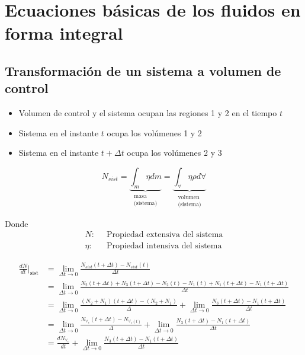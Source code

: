 \section{Ecuaciones básicas de los fluidos en forma integral}

\subsection{Transformación de un sistema a volumen de control}


\begin{itemize}
    \item Volumen de control y el sistema ocupan las regiones 1 y 2 en el tiempo \( t \)
    \item Sistema en el instante \( t \) ocupa los volúmenes 1 y 2
    \item Sistema en el instante \( t + \Delta t \) ocupa los volúmenes 2 y 3
\end{itemize}

\[
    N_{sist} = \underbrace{ \int_{m} \eta dm }_{
        \begin{array}{cc}
            \text{masa} \\
            \text{(sistema)}
        \end{array} } 
    = \underbrace{ \int_{\forall} \eta \rho d \forall }_{
        \begin{array}{cc}
            \text{volumen} \\
            \text{(sistema)}
        \end{array} }
\]

Donde
\[
    \begin{split}
        N: \; & \; \text{Propiedad extensiva del sistema} \\ 
        \eta: & \; \text{Propiedad intensiva del sistema}
    \end{split}
\]

\[
    \begin{split}
        \frac{ dN }{ dt } \Big|_{ \text{sist} } & = \lim_{ \Delta t \to 0 } \frac{ N_{sist}(t + \Delta t) - N_{sist}(t) }{ \Delta t } \\
        & = \lim_{ \Delta t \to 0 } \frac{ N_{2}(t + \Delta t) + N_{3}(t + \Delta t) - N_{2}(t) - N_{1}(t) + N_{1}(t + \Delta t) - N_{1}(t + \Delta t) }{ \Delta t } \\
        & = \lim_{ \Delta t \to 0 } \frac{ (N_{2} + N_{1})(t + \Delta t) - (N_{2} + N_{1}) }{ \Delta } + \lim_{ \Delta t \to 0 } \frac{ N_{3}(t + \Delta t) - N_{1}(t + \Delta t) }{ \Delta t } \\
        & = \lim_{ \Delta t \to 0 } \frac{ N_{ \forall_{c} }(t + \Delta t) - N_{ \forall_{c}(t) }}{ \Delta } + \lim_{ \Delta t \to 0} \frac{ N_{3}(t + \Delta t) - N_{1}(t + \Delta t) }{ \Delta t } \\
        & = \frac{ dN_{ \forall_{c} } }{ dt } + \lim_{ \Delta t \to 0 } \frac{ N_{3}(t + \Delta t) - N_{1}(t + \Delta t) }{ \Delta t }
    \end{split}
\]

